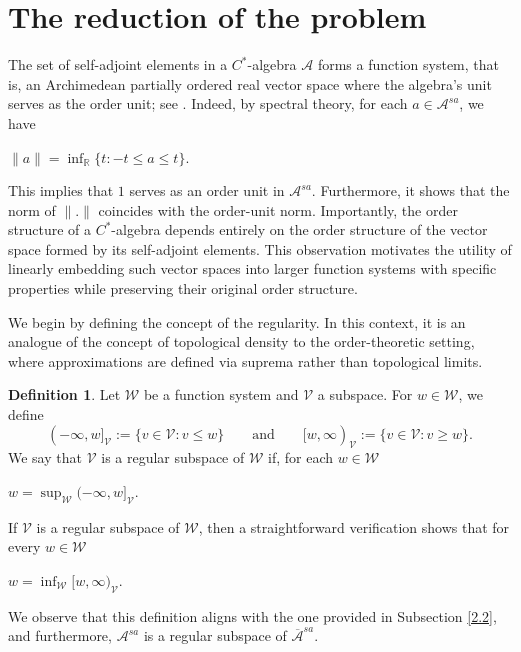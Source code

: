 \documentclass[12pt]{amsart}
\theoremstyle{definition}
\newtheorem{defn}[thm]{Definition}
\theoremstyle{remark}
\numberwithin{equation}{section}
\begin{document}
\section{ The reduction of the problem}\label{S5} 




The set of self-adjoint elements in a $C^*$-algebra $\mathcal{A}$ forms a function system, that is, an Archimedean partially ordered real vector space where the algebra’s unit serves as the order unit; see \cite[pp. 588–589]{Choi}. Indeed,  by spectral theory, for each  $a\in\mathcal{A}^{sa}$,  we have
\begin{center}
	$\|a\|=\inf_{\mathbb{R}}\{t: -t\leq a \leq t\}.$
\end{center}
This implies  that $1$  serves as an order unit in $\mathcal{A}^{sa}$. Furthermore, it shows that the norm of  $\|.\|$  coincides with the order-unit norm. Importantly, the order structure of a $C^*$-algebra depends entirely on the order structure of the vector space formed by its self-adjoint elements. This observation motivates the utility of linearly embedding such vector spaces into larger function systems with specific properties  while preserving their original order structure.






We begin by defining the concept  of the regularity. In this context, it is an analogue of  the concept of topological density to the order-theoretic setting, where approximations are defined via suprema rather than topological limits.  
\begin{defn}
	Let $\mathcal{W}$ be   a function system  and $\mathcal{V}$ a subspace. For $w\in\mathcal{W}$, we define $$(-\infty, w]_{\mathcal{V}}:=\{v\in\mathcal{V}: v\leq w\} \qquad \mbox{and} \qquad [w,\infty)_{\mathcal{V}}:=\{v\in\mathcal{V}: v\geq w\}.$$ 
	We say that $\mathcal{V}$ is a regular subspace of $\mathcal{W}$ if, for each $w\in\mathcal{W}$  \begin{center}
		$w=\sup_{\mathcal{W}}(-\infty, w]_{\mathcal{V}}.$
	\end{center}
	If $\mathcal{V}$ is a regular subspace of $\mathcal{W}$, then a straightforward verification shows that  for every  $w\in\mathcal{W}$  
	\begin{center}
		$w=\inf_{\mathcal{W}}[w,\infty)_{\mathcal{V}}.$
	\end{center}
\end{defn}
We observe that this definition aligns with the one provided in Subsection \ref{2.2}, and furthermore,   $\mathcal{A}^{sa}$ is a regular subspace of $\overline{\mathcal{A}}^{sa}$.
\end{document}
